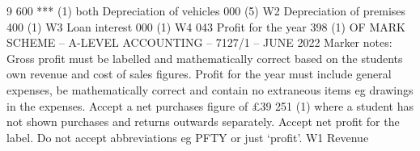 \documentclass{article}
\begin{document}
9 600 *** (1) both \newline
    \newline
Depreciation of vehicles  000 (5) W2 \newline
    \newline
Depreciation of premises  400 (1) W3 \newline
    \newline
Loan interest  000 (1) W4 \newline
    \newline
  \newline
     043   \newline
Profit for the year \newline
  \newline
   398 (1) OF  \newline
 \newline
 \newline
 \newline
MARK SCHEME – A-LEVEL ACCOUNTING – 7127/1 – JUNE 2022  \newline
Marker notes: \newline
 \newline
Gross profit must be labelled and mathematically correct based on the students own revenue and cost of \newline
sales figures. \newline
 \newline
Profit for the year must include general expenses, be mathematically correct and contain no extraneous \newline
items eg drawings in the expenses. \newline
 \newline
Accept a net purchases figure of £39 251 (1) where a student has not shown purchases and returns \newline
outwards separately. \newline
 \newline
Accept net profit for the label. Do not accept abbreviations eg PFTY or just ‘profit’. \newline
 \newline
W1 Revenue \newline
 \newline
\end{document}
